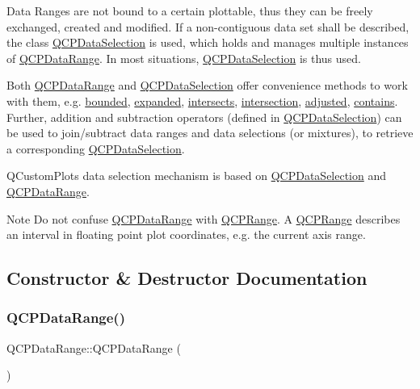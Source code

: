 Data Ranges are not bound to a certain plottable, thus they can be freely exchanged, created and modified. If a non-\/contiguous data set shall be described, the class \hyperlink{classQCPDataSelection}{Q\+C\+P\+Data\+Selection} is used, which holds and manages multiple instances of \hyperlink{classQCPDataRange}{Q\+C\+P\+Data\+Range}. In most situations, \hyperlink{classQCPDataSelection}{Q\+C\+P\+Data\+Selection} is thus used.

Both \hyperlink{classQCPDataRange}{Q\+C\+P\+Data\+Range} and \hyperlink{classQCPDataSelection}{Q\+C\+P\+Data\+Selection} offer convenience methods to work with them, e.\+g. \hyperlink{classQCPDataRange_a93529421d12fdd3a8bdb2b8061936352}{bounded}, \hyperlink{classQCPDataRange_a36c8ad8acf177ffeb0a72c8d73030844}{expanded}, \hyperlink{classQCPDataRange_a8a1c437f9beffd55621f48f961d7f679}{intersects}, \hyperlink{classQCPDataRange_a84e1e03129dd52528efb4bac18d30183}{intersection}, \hyperlink{classQCPDataRange_a279ed36602b39607699dc5652bcaf813}{adjusted}, \hyperlink{classQCPDataRange_a13ca398776374a3160aa85433718b812}{contains}. Further, addition and subtraction operators (defined in \hyperlink{classQCPDataSelection}{Q\+C\+P\+Data\+Selection}) can be used to join/subtract data ranges and data selections (or mixtures), to retrieve a corresponding \hyperlink{classQCPDataSelection}{Q\+C\+P\+Data\+Selection}.

Q\+Custom\+Plot\textquotesingle{}s data selection mechanism is based on \hyperlink{classQCPDataSelection}{Q\+C\+P\+Data\+Selection} and \hyperlink{classQCPDataRange}{Q\+C\+P\+Data\+Range}.

\begin{DoxyNote}{Note}
Do not confuse \hyperlink{classQCPDataRange}{Q\+C\+P\+Data\+Range} with \hyperlink{classQCPRange}{Q\+C\+P\+Range}. A \hyperlink{classQCPRange}{Q\+C\+P\+Range} describes an interval in floating point plot coordinates, e.\+g. the current axis range. 
\end{DoxyNote}


\subsection{Constructor \& Destructor Documentation}
\mbox{\label{classQCPDataRange_a49e72fd9bace1da9d875136dcc04c986}} 
\subsubsection{\texorpdfstring{Q\+C\+P\+Data\+Range()}{QCPDataRange()}\hspace{0.1cm}{\footnotesize\ttfamily [1/2]}}
{\footnotesize\ttfamily Q\+C\+P\+Data\+Range\+::\+Q\+C\+P\+Data\+Range (\begin{DoxyParamCaption}{ }\end{DoxyParamCaption})}

